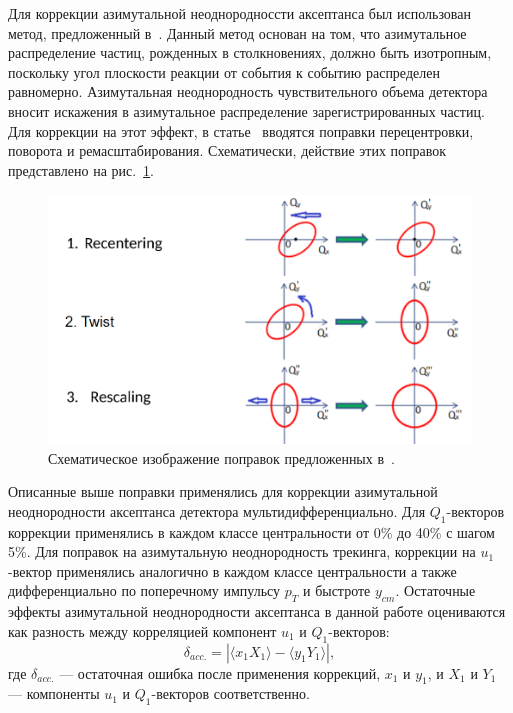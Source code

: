 Для коррекции азимутальной неоднородноссти аксептанса был использован метод, предложенный в~\cite{Selyuzhenkov:2007zi}.
Данный метод основан на том, что азимутальное распределение частиц, рожденных в столкновениях, должно быть изотропным, поскольку угол плоскости реакции от события к событию распределен равномерно.
Азимутальная неоднородность чувствительного объема детектора вносит искажения в азимутальное распределение зарегистрированных частиц. 
Для коррекции на этот эффект, в статье~\cite{Selyuzhenkov:2007zi} вводятся поправки перецентровки, поворота и ремасштабирования. 
Схематически, действие этих поправок представлено на рис.~\ref{fig:qn_corrections}.
%
\begin{figure}[ht]
\begin{center}
\includegraphics[width=0.75\linewidth]{images/qntools_corrections.png}
\caption{Схематическое изображение поправок предложенных в~\cite{Selyuzhenkov:2007zi}.}
\label{fig:qn_corrections}
\end{center}
\end{figure}
%

Описанные выше поправки применялись для коррекции азимутальной неоднородности аксептанса детектора мультидифференциально.
Для $Q_1$-векторов коррекции применялись в каждом классе центральности от 0\% до 40\% с шагом 5\%.
Для поправок на азимутальную неоднородность трекинга, коррекции на $u_1$-вектор применялись аналогично в каждом классе центральности а также дифференциально по поперечному импульсу $p_T$ и быстроте $y_{cm}$. 
Остаточные эффекты азимутальной неоднородности аксептанса в данной работе оцениваются как разность между корреляцией компонент $u_1$ и $Q_1$-векторов:
\begin{equation}
    \delta_{acc.} = | \langle x_1 X_1 \rangle - \langle y_1 Y_1 \rangle |,
\end{equation}
где $\delta_{acc.}$ --- остаточная ошибка после применения коррекций, $x_1$ и $y_1$, и $X_1$ и $Y_1$ --- компоненты $u_1$ и $Q_1$-векторов соответственно. 


